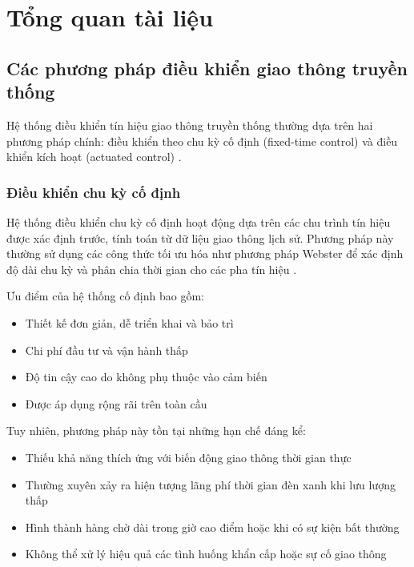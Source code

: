 
\chapter{Tổng quan tài liệu}
\section{Các phương pháp điều khiển giao thông truyền thống}

Hệ thống điều khiển tín hiệu giao thông truyền thống thường dựa trên hai phương pháp chính: điều khiển theo chu kỳ cố định (fixed-time control) và điều khiển kích hoạt (actuated control) \cite{Papageorgiou2003, Eom2020}. 

\subsection{Điều khiển chu kỳ cố định}

Hệ thống điều khiển chu kỳ cố định hoạt động dựa trên các chu trình tín hiệu được xác định trước, tính toán từ dữ liệu giao thông lịch sử. Phương pháp này thường sử dụng các công thức tối ưu hóa như phương pháp Webster để xác định độ dài chu kỳ và phân chia thời gian cho các pha tín hiệu \cite{Webster1958, Urbanik2015, Shingate2020}. 

Ưu điểm của hệ thống cố định bao gồm:
\begin{itemize}
    \item Thiết kế đơn giản, dễ triển khai và bảo trì
    \item Chi phí đầu tư và vận hành thấp
    \item Độ tin cậy cao do không phụ thuộc vào cảm biến
    \item Được áp dụng rộng rãi trên toàn cầu
\end{itemize}

Tuy nhiên, phương pháp này tồn tại những hạn chế đáng kể:
\begin{itemize}
    \item Thiếu khả năng thích ứng với biến động giao thông thời gian thực
    \item Thường xuyên xảy ra hiện tượng lãng phí thời gian đèn xanh khi lưu lượng thấp
    \item Hình thành hàng chờ dài trong giờ cao điểm hoặc khi có sự kiện bất thường
    \item Không thể xử lý hiệu quả các tình huống khẩn cấp hoặc sự cố giao thông
\end{itemize}

